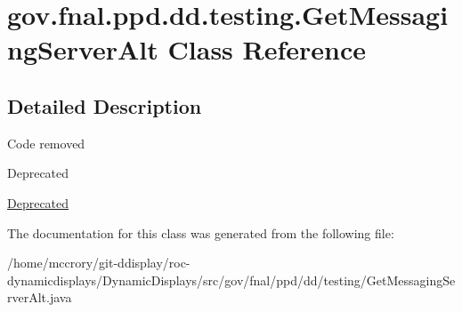 \hypertarget{classgov_1_1fnal_1_1ppd_1_1dd_1_1testing_1_1GetMessagingServerAlt}{\section{gov.\-fnal.\-ppd.\-dd.\-testing.\-Get\-Messaging\-Server\-Alt Class Reference}
\label{classgov_1_1fnal_1_1ppd_1_1dd_1_1testing_1_1GetMessagingServerAlt}
}


\subsection{Detailed Description}
Code removed \begin{DoxyRefDesc}{Deprecated}
\item[\hyperlink{deprecated__deprecated000007}{Deprecated}]\end{DoxyRefDesc}


The documentation for this class was generated from the following file\-:\begin{DoxyCompactItemize}
\item 
/home/mccrory/git-\/ddisplay/roc-\/dynamicdisplays/\-Dynamic\-Displays/src/gov/fnal/ppd/dd/testing/Get\-Messaging\-Server\-Alt.\-java\end{DoxyCompactItemize}
